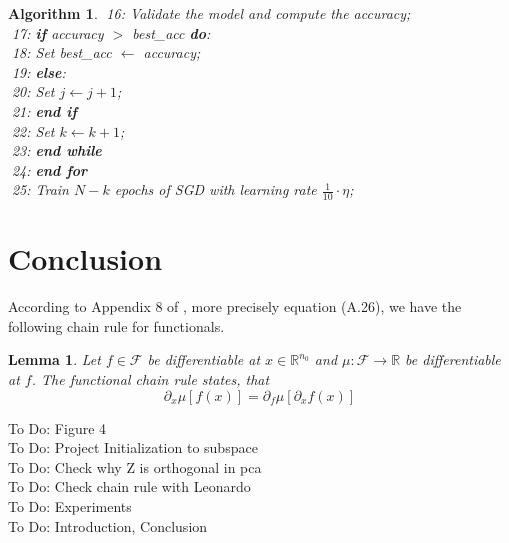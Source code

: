 \documentclass[11pt, a4paper]{article}
\newtheorem{lemma}[theorem]{Lemma}
\newtheorem{algorithm}[theorem]{Algorithm}
\newcommand{\R}{\mathbb{R}}
\newcommand{\F}{\mathcal{F}}
\begin{document}
\begin{algorithm}
\textcolor{white}{$\Big |$}16: \quad \quad Validate the model and compute the accuracy; \\
\textcolor{white}{$\Big |$}17: \quad \quad \textbf{if} accuracy $>$ best\_acc \textbf{do}: \\
\textcolor{white}{$\Big |$}18: \quad \quad \quad Set best\_acc $\leftarrow$ accuracy; \\
\textcolor{white}{$\Big |$}19: \quad \quad \textbf{else}: \\
\textcolor{white}{$\Big |$}20: \quad \quad \quad Set $j \leftarrow j +1$; \\
\textcolor{white}{$\Big |$}21: \quad \quad \textbf{end if} \\
\textcolor{white}{$\Big |$}22: \quad \quad Set $k \leftarrow k+1$; \\
\textcolor{white}{$\Big |$}23: \quad \textbf{end while} \\
\textcolor{white}{$\Big |$}24: \textbf{end for} \\
\textcolor{white}{$\Big |$}25: Train $N-k$ epochs of SGD with learning rate $\frac{1}{10}\cdot \eta$; \\
\end{algorithm}


\pagebreak
\section{Conclusion}

According to Appendix 8 of \cite{Functionals}, more precisely equation (A.26), we have the following chain rule for functionals.

\begin{lemma}
Let $f \in \F$ be differentiable at $x \in \R^{n_0}$ and $\mu : \F \to \R$ be differentiable at $f$. The functional chain rule states, that
\[ \partial_x \mu[f(x)] = \partial_f \mu[\partial_xf(x)] \]
\end{lemma}

To Do: Figure 4 \\

To Do: Project Initialization to subspace \\

To Do: Check why Z is orthogonal in pca \\

To Do: Check chain rule with Leonardo \\

To Do: Experiments \\

To Do: Introduction, Conclusion \\
\end{document}
